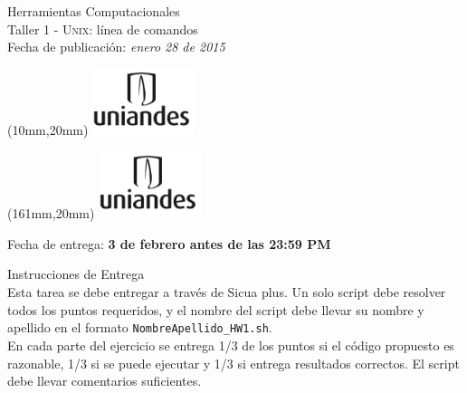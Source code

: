 \documentclass[11pt,letterpaper]{exam}
\begin{document}
\begin{center}
{\Large Herramientas Computacionales} \\
Taller 1 - \textsc{Unix}: línea de comandos \\
Fecha de publicación: {\small \it enero 28 de 2015}\\
\end{center}

\begin{textblock*}{40mm}(10mm,20mm)
  \includegraphics[width=3cm]{logoUniandes.png}
\end{textblock*}

\begin{textblock*}{40mm}(161mm,20mm)
  \includegraphics[width=3cm]{logoUniandes.png}
\end{textblock*}

\vspace{0.5cm}

{\Large Fecha de entrega:  \bf 3 de febrero antes de las 23:59 PM}

\vspace{0.5cm}

{\Large Instrucciones de Entrega}\\

Esta tarea se debe entregar a través de Sicua plus. Un solo script debe resolver todos los puntos requeridos, y el nombre del script debe llevar su nombre y apellido en el formato \verb"NombreApellido_HW1.sh". \\

En cada parte del ejercicio se entrega 1/3  de los puntos si el código propuesto es razonable, 1/3 si se puede ejecutar y 1/3 si entrega resultados correctos. El script debe llevar comentarios suficientes.


\vspace{0.5cm}
\end{document}
